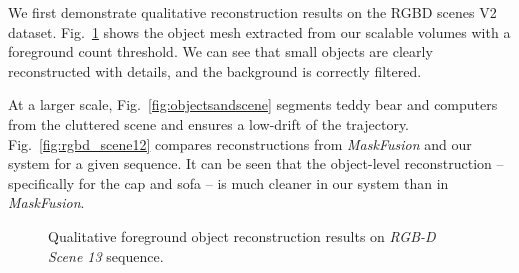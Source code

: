 We first demonstrate qualitative reconstruction results on the RGBD scenes V2 dataset.  Fig.~\ref{fig:rgbd_scene13} shows the object mesh extracted from our scalable volumes with a foreground count threshold. We can see that small objects are clearly reconstructed with details, and the background is correctly filtered.

At a larger scale, Fig.~\ref{fig:objectsandscene} segments teddy bear and computers from the cluttered scene and ensures a low-drift of the trajectory. Fig.~\ref{fig:rgbd_scene12} compares reconstructions from \textit{MaskFusion} \cite{runz_maskfusion_2018} and our system for a given sequence. It can be seen that the object-level reconstruction -- specifically for the cap and sofa -- is much cleaner in our system than in \textit{MaskFusion}.

\begin{figure}[t!]
    \centering
    \caption{Qualitative foreground object reconstruction results on \emph{RGB-D Scene 13} sequence.}
    \vspace*{-1em}
    \label{fig:rgbd_scene13}
\end{figure}

